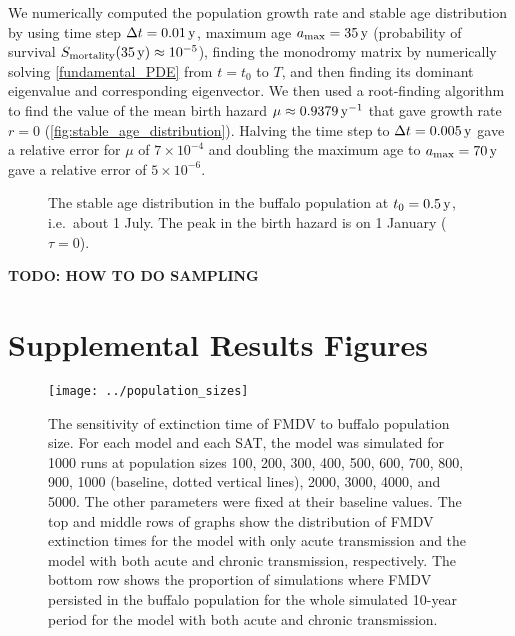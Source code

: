 \documentclass[12pt]{article}
\newcommand{\appendixlabel}{S}
\newcounter{chapter}
\renewcommand{\thechapter}{\appendixlabel\arabic{chapter}}
\renewcommand{\thefigure}{\thechapter.\arabic{figure}}
\begin{document}
We numerically computed the population growth rate and stable age
distribution by using time step $\Delta t = \unit[0.01]{y}$,
maximum age $a_{\text{max}} = \unit[35]{y}$
(probability of survival
$S_{\text{mortality}}(\unit[35]{y}) \approx 10^{-5}$),
finding the monodromy matrix by numerically solving
\eqref{fundamental_PDE} from $t = t_0$ to $T$, and
then finding its dominant eigenvalue and corresponding eigenvector.
We then used a root-finding algorithm to find the value of the mean
birth hazard $\mu \approx \unit[0.9379]{y^{-1}}$ that gave growth rate
$r = 0$ (\autoref{fig:stable_age_distribution}). Halving the time
step to $\Delta t = \unit[0.005]{y}$ gave a relative error for $\mu$
of $7 \times 10^{-4}$ and doubling the maximum age to $a_{\text{max}}
= \unit[70]{y}$ gave a relative error of $5 \times 10^{-6}$.

\begin{figure}
  \centering
  \begin{sansmath}
    
  \end{sansmath}
  \caption{The stable age distribution in the buffalo population
    at $t_0 = \unit[0.5]{y}$, i.e.~about 1 July. The peak in the birth
    hazard is on 1 January ($\tau = 0$).}
  \label{fig:stable_age_distribution}
\end{figure}

\textbf{TODO: HOW TO DO SAMPLING}


\printbibliography


\newpage
\appendix
\section*{Supplemental Results Figures}
\setcounter{figure}{\value{chapter}}
\renewcommand{\thefigure}{\appendixlabel\arabic{figure}}
\renewcommand{\HyperDestNameFilter}[1]{chapter-#1}


\begin{figure}
  \centering
  \texttt{[image: ../population\_sizes]}
  \caption{The sensitivity of extinction time of FMDV to buffalo
    population size.
    For each model and each SAT, the model was simulated for 1000 runs
    at population sizes 100, 200, 300, 400, 500, 600, 700, 800, 900,
    1000 (baseline, dotted vertical lines), 2000, 3000, 4000, and
    5000.
    The other parameters were fixed at their baseline values.
    The top and middle rows of graphs show the distribution of
    FMDV extinction times for the model with only acute transmission
    and the model with both acute and chronic transmission,
    respectively.
    The bottom row shows the proportion of simulations where FMDV
    persisted in the buffalo population for the whole simulated
    10-year period for the model with both acute and chronic
    transmission.}
\end{figure}
\end{document}
